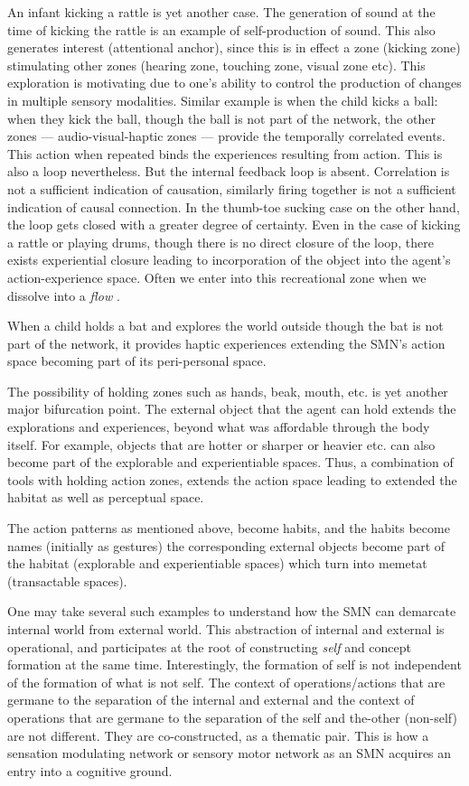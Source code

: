 An infant kicking a rattle is yet another case. The generation of sound at the time of kicking the rattle is an example of self-production of sound. This also generates interest (attentional anchor), since this is in effect a zone (kicking zone) stimulating other zones (hearing zone, touching zone, visual zone etc). This exploration is motivating due to one's ability to control the production of changes in multiple sensory modalities. Similar example is when the child kicks a ball: when they kick the ball, though the ball is not part of the network, the other zones --- audio-visual-haptic zones --- provide the temporally correlated events. This action when repeated binds the experiences resulting from action. This is also a loop nevertheless. But the internal feedback loop is absent. Correlation is not a sufficient indication of causation, similarly firing together is not a sufficient indication of causal connection. In the thumb-toe sucking case on the other hand, the loop gets closed with a greater degree of certainty. Even in the case of kicking a rattle or playing drums, though there is no direct closure of the loop, there exists experiential closure leading to incorporation of the object into the agent's action-experience space. Often we enter into this recreational zone when we dissolve into a \textit{flow} \cite{Mihaly}. 

When a child holds a bat and explores the world outside though the bat is not part of the network, it provides haptic experiences extending the SMN's action space becoming part of its peri-personal space. 

The possibility of holding zones such as hands, beak, mouth, etc. is yet another major bifurcation point. The external object that the agent can hold extends the explorations and experiences, beyond what was affordable through the body itself. For example, objects that are hotter or sharper or heavier etc. can also become part of the explorable and experientiable spaces. Thus, a combination of tools with holding action zones, extends the action space leading to extended the habitat as well as perceptual space. 

The action patterns as mentioned above, become habits, and the habits become names (initially as gestures) the corresponding external objects become part of the habitat (explorable and experientiable spaces) which turn into memetat (transactable spaces). 

One may take several such examples to understand how the SMN can demarcate internal world from external world. This abstraction of internal and external is operational, and participates at the root of constructing \textit{self} and concept formation at the same time. Interestingly, the formation of self is not independent of the formation of what is not self. The context of operations/actions that are germane to the separation of the internal and external and the context of operations that are germane to the separation of the self and the-other (non-self) are not different. They are co-constructed, as a thematic pair. This is how a sensation modulating network or sensory motor network as an SMN acquires an entry into a cognitive ground. 

